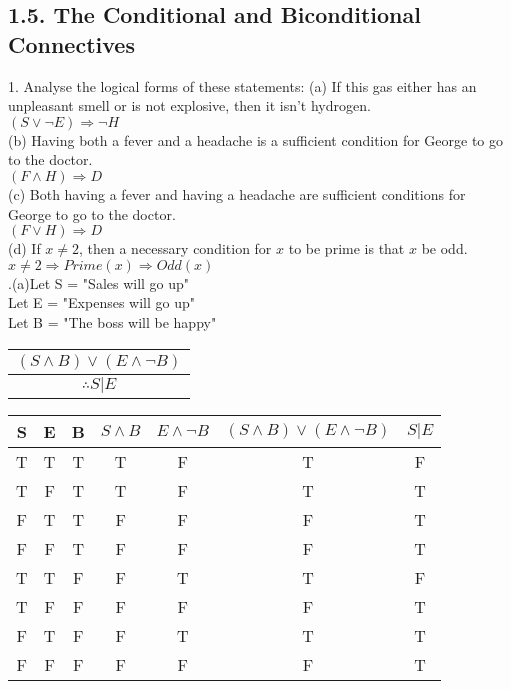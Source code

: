 \documentclass{article}
\begin{document}
\subsection*{1.5. The Conditional and Biconditional Connectives}
1. Analyse the logical forms of these statements:
(a) If this gas either has an unpleasant smell or is not explosive, then it isn't hydrogen.\\
$(S \vee \neg E)\Rightarrow \neg H$\\
(b) Having both a fever and a headache is a sufficient condition for George to go to the doctor.\\
$(F \wedge H)\Rightarrow D$\\
(c) Both having a fever and having a headache are sufficient conditions for George to go to the doctor.\\
$(F \vee H) \Rightarrow D$\\
(d) If $x \not = 2$, then a necessary condition for $x$ to be prime is that $x$ be odd.\\
$x \not = 2 \Rightarrow Prime(x) \Rightarrow Odd(x)$\\
.(a)Let S = "Sales will go up"\\
 Let E = "Expenses will go up"\\
 Let B = "The boss will be happy"\\
 \begin{tabular}{c}
 $(S \wedge B) \vee (E \wedge \neg B)$\\
 \hline
 $\therefore S | E$\\
 \end{tabular}
  \vspace{2em}
 \linebreak
 \begin{tabular}{c|c|c|c|c|c|c}
 S&E&B&$S \wedge B$&$E \wedge \neg B$&$(S \wedge B) \vee (E \wedge \neg B)$&$S | E$\\
 \hline
 T&T&T&T&F&T&F\\
 T&F&T&T&F&T&T\\
 F&T&T&F&F&F&T\\
 F&F&T&F&F&F&T\\
 T&T&F&F&T&T&F\\
 T&F&F&F&F&F&T\\
 F&T&F&F&T&T&T\\
 F&F&F&F&F&F&T\\
 \end{tabular}
  \vspace{2em}
 \linebreak
\end{document}
